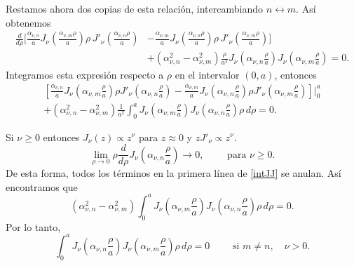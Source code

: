 \begin{scriptsize}
Restamos ahora dos copias de esta relación, intercambiando $n \leftrightarrow m$. Así obtenemos
\begin{align}
\frac{d}{d\rho} \Big[\frac{\alpha_{\nu,n}}{a} J_\nu\left(\frac{\alpha_{\nu,m} \rho}{a}\right) \rho\, J'_\nu\left(\frac{\alpha_{\nu,n} \rho}{a}\right) &- \frac{\alpha_{\nu,m}}{a}J_\nu\left(\frac{\alpha_{\nu,n}\rho}{a}\right) \rho\, J'_\nu\left(\frac{\alpha_{\nu,m}\rho}{a}\right) \Big] \\
&+ \left( \alpha_{\nu,n}^2 - \alpha_{\nu,m}^2 \right) \frac{\rho}{a^2} J_\nu\left(\alpha_{\nu,n} \frac{\rho}{a}\right) J_\nu\left(\alpha_{\nu,m} \frac{\rho}{a}\right) = 0.
\end{align}
Integramos esta expresión respecto a $\rho$ en el intervalor $(0,a)$, entonces
\begin{align}
\left[ \frac{\alpha_{\nu,n}}{a}J_\nu\left(\alpha_{\nu,m} \frac{\rho}{a}\right) \rho J'_\nu \left(\alpha_{\nu,n} \frac{\rho}{a}\right) - \frac{\alpha_{\nu,m}}{a}J_\nu\left(\alpha_{\nu,n} \frac{\rho}{a}\right) \rho J'_\nu\left(\alpha_{\nu,m} \frac{\rho}{a}\right) \right] \Bigg|_0^a \nonumber \\
+ \left(\alpha_{\nu,n}^2 - \alpha_{\nu,m}^2\right) \frac{1}{a^2} \int_0^a J_\nu\left(\alpha_{\nu,m} \frac{\rho}{a}\right) J_\nu\left(\alpha_{\nu,n} \frac{\rho}{a}\right) \rho\, d\rho = 0. \label{intJJ}
\end{align}

Si $\nu \ge 0$ entonces $J_\nu(z) \propto z^\nu$ para $z \approx 0$ y $z J'_\nu \propto z^\nu$. 
\begin{equation}
 \lim_{\rho \to 0} \rho \frac{d}{d\rho} J_\nu\left(\alpha_{\nu,n} \frac{\rho}{a}\right) \to 0,  \qquad  \text{ para } \nu \ge 0.
\end{equation}
De esta forma, todos los términos en la primera línea de \eqref{intJJ} se anulan. Así encontramos que 
\begin{equation}
\left(\alpha_{\nu,n}^2 - \alpha_{\nu,m}^2\right) \int_0^a J_\nu\left(\alpha_{\nu,m} \frac{\rho}{a}\right) J_\nu\left(\alpha_{\nu,n} \frac{\rho}{a}\right) \rho\, d\rho = 0.
\end{equation}
Por lo tanto,
\begin{equation}
\int_0^a J_\nu\left(\alpha_{\nu,n} \frac{\rho}{a}\right) J_\nu\left(\alpha_{\nu,m} \frac{\rho}{a}\right) \rho\, d\rho = 0 \qquad \text{ si } m \neq n, \quad \nu>0.
\end{equation}


\end{scriptsize}
